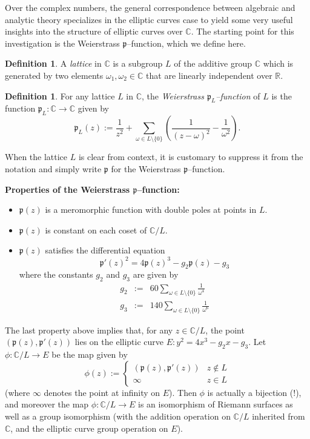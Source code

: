 \documentclass{article}
\newcommand{\p}{{\mathfrak{p}}}
\newcommand{\C}{\mathbb{C}}
\newcommand{\R}{\mathbb{R}}
\theoremstyle{definition}
\newtheorem{definition}[theorem]{Definition}
\begin{document}
Over the complex numbers, the general correspondence between algebraic and analytic theory specializes in the elliptic curves case to yield some very useful insights into the structure of elliptic curves over $\mathbb{C}$. The starting point for this investigation is the Weierstrass $\p$--function, which we define here.

\begin{definition}
A {\em lattice} in $\C$ is a subgroup $L$ of the additive group $\mathbb{C}$ which is generated by two elements $\omega_1, \omega_2 \in \C$ that are linearly independent over $\R$.
\end{definition}

\begin{definition}
For any lattice $L$ in $\C$, the {\em Weierstrass $\p_L$--function} of $L$ is the function $\p_L: \C \longrightarrow \C$ given by
$$
\p_L(z) := \frac{1}{z^2} + \sum_{\omega \in L \setminus \{0\}} \left( \frac{1}{(z-\omega)^2} - \frac{1}{\omega^2}\right).
$$
\end{definition}

When the lattice $L$ is clear from context, it is customary to suppress it from the notation and simply write $\p$ for the Weierstrass $\p$--function.

{\bf Properties of the Weierstrass $\p$--function:}

\begin{itemize}
\item $\p(z)$ is a meromorphic function with double poles at points in $L$.
\item $\p(z)$ is constant on each coset of $\C/L$.
\item $\p(z)$ satisfies the differential equation
$$
\p'(z)^2 = 4 \p(z)^3 - g_2 \p(z) - g_3
$$
where the constants $g_2$ and $g_3$ are given by
\begin{eqnarray*}
g_2 & := & 60 \sum_{\omega \in L \setminus \{0\}} \frac{1}{\omega^4} \\
g_3 & := & 140 \sum_{\omega \in L \setminus \{0\}} \frac{1}{\omega^6}
\end{eqnarray*}
\end{itemize}

The last property above implies that, for any $z \in \C/L$, the point $(\p(z),\p'(z))$ lies on the elliptic curve $E: y^2 = 4x^3 - g_2 x - g_3$. Let $\phi: \C/L \longrightarrow E$ be the map given by
$$
\phi(z) := 
\begin{cases}
(\p(z),\p'(z)) & z \notin L \\
\infty & z \in L
\end{cases}
$$
(where $\infty$ denotes the point at infinity on $E$). Then $\phi$ is actually a bijection (!), and moreover the map $\phi: \C/L \longrightarrow E$ is an isomorphism of Riemann surfaces as well as a group isomorphism (with the addition operation on $\C/L$ inherited from $\C$, and the elliptic curve group operation on $E$).
\end{document}
